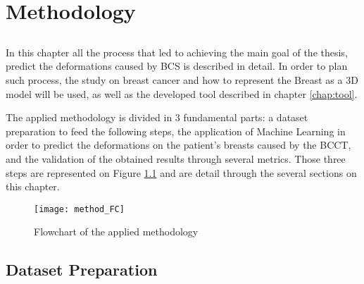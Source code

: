 \chapter{Methodology}\label{chap:method}

\section*{}
In this chapter all the process that led to achieving the main goal of the thesis, predict the deformations caused by BCS is described in detail.
In order to plan such process, the study on breast cancer and how to represent the Breast as a 3D model will be used, as well as the developed tool described in chapter \ref{chap:tool}.

The applied methodology is divided in 3 fundamental parts: a dataset preparation to feed the following steps, the application of Machine Learning in order to predict the deformations on the patient's breasts caused by the BCCT, and the validation of the obtained results through several metrics. Those three steps are represented on Figure \ref{fig:method_FC} and are detail through the several sections on this chapter.

\begin{figure}[!h]
\begin{center}
    \leavevmode
    \texttt{[image: method\_FC]}
    \caption[Flowchart of the applied methodology]{Flowchart of the applied methodology}
    \label{fig:method_FC}
  \end{center}
\end{figure}

\section{Dataset Preparation}\label{sec:dataset_prep}

